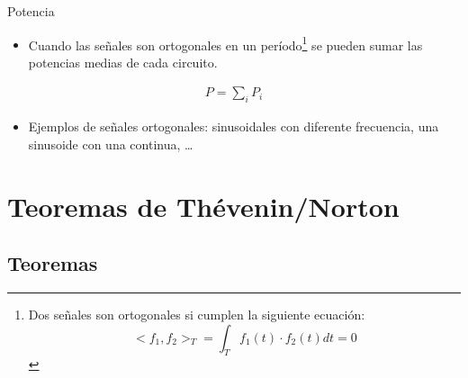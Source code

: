 \documentclass[aspectratio=169, usenames,svgnames,dvipsnames]{beamer}
\begin{document}
\begin{frame}[label={sec:org1c30a0f}]{Potencia}
\begin{itemize}
\item Cuando las señales son \alert{ortogonales en un período}\footnote{Dos señales son ortogonales si cumplen la siguiente ecuación:
\[<f_1, f_2>_T = \int_T f_1(t) \cdot f_2(t) dt = 0\]} se pueden sumar las potencias \alert{medias} de cada circuito.
\end{itemize}
\begin{align*}
  P = \sum_i P_i
\end{align*}
\begin{itemize}
\item Ejemplos de señales ortogonales: sinusoidales con diferente frecuencia, una sinusoide con una continua, \ldots{}
\end{itemize}
\end{frame}


\section{Teoremas de Thévenin/Norton}
\label{sec:org1434b9c}

\subsection{Teoremas}
\label{sec:orgdcf8b1a}
\end{document}
